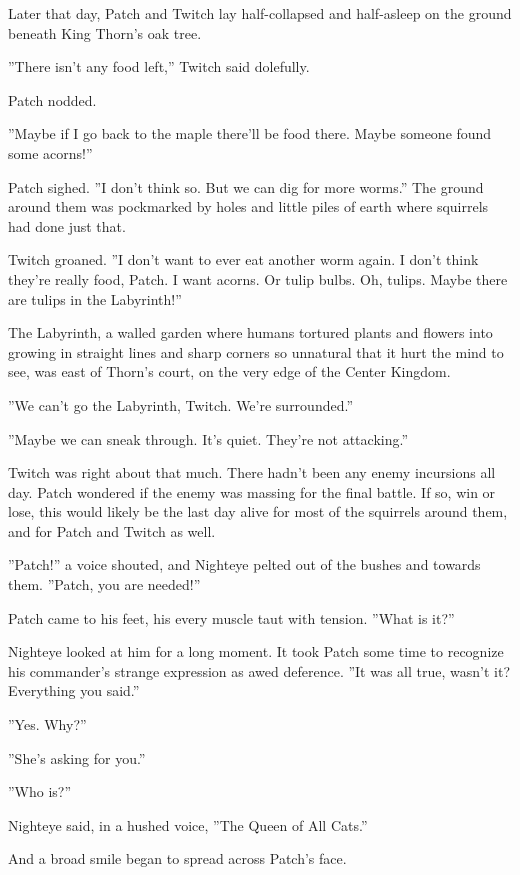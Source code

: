 \documentclass[12pt]{book}
\begin{document}
 Later that day, Patch and Twitch lay half-collapsed and half-asleep on the ground beneath King Thorn's oak tree.\par
 ''There isn't any food left,'' Twitch said dolefully.\par
 Patch nodded.\par
 ''Maybe if I go back to the maple there'll be food there. Maybe someone found some acorns!''\par
 Patch sighed. ''I don't think so. But we can dig for more worms.'' The ground around them was pockmarked by holes and little piles of earth where squirrels had done just that.\par
 Twitch groaned. ''I don't want to ever eat another worm again. I don't think they're really food, Patch. I want acorns. Or tulip bulbs. Oh, tulips. Maybe there are tulips in the Labyrinth!''\par
 The Labyrinth, a walled garden where humans tortured plants and flowers into growing in straight lines and sharp corners so unnatural that it hurt the mind to see, was east of Thorn's court, on the very edge of the Center Kingdom.\par
 ''We can't go the Labyrinth, Twitch. We're surrounded.''\par
 ''Maybe we can sneak through. It's quiet. They're not attacking.''\par
 Twitch was right about that much. There hadn't been any enemy incursions all day. Patch wondered if the enemy was massing for the final battle. If so, win or lose, this would likely be the last day alive for most of the squirrels around them, and for Patch and Twitch as well.\par
 ''Patch!'' a voice shouted, and Nighteye pelted out of the bushes and towards them. ''Patch, you are needed!''\par
 Patch came to his feet, his every muscle taut with tension. ''What is it?''\par
 Nighteye looked at him for a long moment. It took Patch some time to recognize his commander's strange expression as awed deference. ''It was all true, wasn't it? Everything you said.''\par
 ''Yes. Why?''\par
 ''She's asking for you.''\par
 ''Who is?''\par
 Nighteye said, in a hushed voice, ''The Queen of All Cats.''\par
 And a broad smile began to spread across Patch's face.\par
\end{document}
